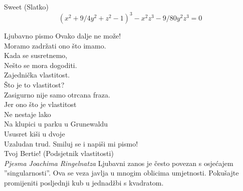 \begin{surferPage}{Sweet (Slatko)}
\[(x^2+ 9/4y^2	+ z^2- 1)^3- x^2z^3	- 9/80y^2z^3	= 0\]

\singlespacing
Ljubavno pismo
\singlespacing
Ovako dalje ne mo\v{z}e!\\
Moramo zadr\v{z}ati ono \v{s}to imamo.\\
Kada se susretnemo,\\
Ne\v{s}to se mora dogoditi.\\
Zajedni\v{c}ka vlastitost.\\
\v{S}to je to vlastitost?\\
Zasigurno nije samo otrcana fraza.\\
Jer ono \v{s}to je vlastitost\\
Ne nestaje lako\\
Na klupici u parku u Grunewaldu\\
Ususret ki\v{s}i u dvoje\\
Uzaludan trud. Smiluj se i napi\v{s}i mi pismo!\\
Tvoj Bertie! (Podsjetnik vlastitosti)\\
{\it Pjesma Joachima Ringelnatza}
\singlespacing
Ljubavni zanos je \v{c}esto povezan s osje\'{c}ajem ''singularnosti''. Ova se veza javlja u mnogim oblicima umjetnosti.
\singlespacing
Poku\v{s}ajte promijeniti posljednji kub u jednad\v{z}bi s kvadratom.
\end{surferPage}
